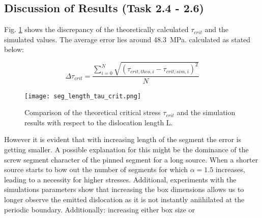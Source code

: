 \subsection{Discussion of Results (Task 2.4 - 2.6)}
Fig. \ref{fig:tau_crit_theo_vs_sim} shows the discrepancy of the theoretically calculated \(\tau_{crit}\) and the simulated values. The average error lies around 48.3~MPa. calculated as stated below:

\begin{equation}
	\Delta \tau_{crit} = \frac{\sum_{i=0}^{N} \sqrt{(\tau_{crit,theo,i} - \tau_{crit,sim,i})^{2}}}{N} 
\end{equation}

\begin{figure}[htb]
	\centering
	\texttt{[image: seg\_length\_tau\_crit.png]}
	\caption{Comparison of the theoretical critical stress \(\tau_{crit}\) and the simulation results with respect to the dislocation length L.}
	\label{fig:tau_crit_theo_vs_sim}
\end{figure}

However it is evident that with increasing length of the segment the error is getting smaller. A possible explanation for this might be the dominance of the screw segment character of the pinned segment for a long source. When a shorter source starts to bow out the number of segments for which \(\alpha = 1.5\) increases, leading to a necessity for higher stresses. Additional, experiments with the simulations parameters show that increasing the box dimensions allows us to longer observe the emitted dislocation as it is not instantly aniihilated at the periodic boundary. Additionally: increasing either box size or 


\printbibliography


